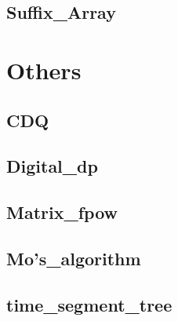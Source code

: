     \subsection{Suffix\_Array}
        

\section{Others}
    \subsection{CDQ}
        
    \subsection{Digital\_dp}
        
    \subsection{Matrix\_fpow}
        
    \subsection{Mo's\_algorithm}
        
    \subsection{time\_segment\_tree}
        
    